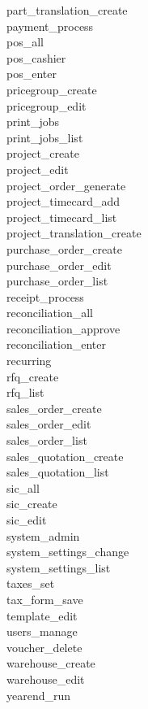\begin{description}
\item [part\_translation\_create]
\item [payment\_process]
\item [pos\_all]
\item [pos\_cashier]
\item [pos\_enter]
\item [pricegroup\_create]
\item [pricegroup\_edit]
\item [print\_jobs]
\item [print\_jobs\_list]
\item [project\_create]
\item [project\_edit]
\item [project\_order\_generate]
\item [project\_timecard\_add]
\item [project\_timecard\_list]
\item [project\_translation\_create]
\item [purchase\_order\_create]
\item [purchase\_order\_edit]
\item [purchase\_order\_list]
\item [receipt\_process]
\item [reconciliation\_all]
\item [reconciliation\_approve]
\item [reconciliation\_enter]
\item [recurring]
\item [rfq\_create]
\item [rfq\_list]
\item [sales\_order\_create]
\item [sales\_order\_edit]
\item [sales\_order\_list]
\item [sales\_quotation\_create]
\item [sales\_quotation\_list]
\item [sic\_all]
\item [sic\_create]
\item [sic\_edit]
\item [system\_admin]
\item [system\_settings\_change]
\item [system\_settings\_list]
\item [taxes\_set]
\item [tax\_form\_save]
\item [template\_edit]
\item [users\_manage]
\item [voucher\_delete]
\item [warehouse\_create]
\item [warehouse\_edit]
\item [yearend\_run]
\end{description}

